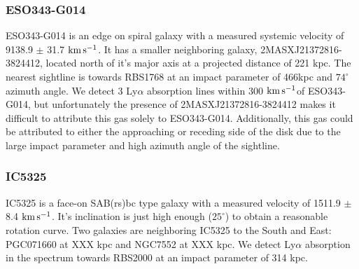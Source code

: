 \documentclass[iop]{emulateapj-rtx4}
\newcommand{\kms}{$\rm km\, s^{-1}$}
\begin{document}
%
%


\subsubsection{ESO343-G014}
ESO343-G014 is an edge on spiral galaxy with a measured systemic velocity of 9138.9 $\pm$ 31.7 \kms. It has a smaller neighboring galaxy, 2MASXJ21372816-3824412, located north of it's major axis at a projected distance of 221 kpc. The nearest sightline is towards RBS1768 at an impact parameter of 466kpc and $74^{\circ}$ azimuth angle. We detect 3 Ly$\alpha$ absorption lines within 300 \kms of ESO343-G014, but unfortunately the presence of 2MASXJ21372816-3824412 makes it difficult to attribute this gas solely to ESO343-G014. Additionally, this gas could be attributed to either the approaching or receding side of the disk due to the large impact parameter and high azimuth angle of the sightline. 

%


\subsubsection{IC5325}
IC5325 is a face-on SAB(rs)bc type galaxy with a measured velocity of 1511.9 $\pm$ 8.4 \kms. It's inclination is just high enough ($25^{\circ}$) to obtain a reasonable rotation curve. Two galaxies are neighboring IC5325 to the South and East: PGC071660 at XXX kpc and NGC7552 at XXX kpc. We detect Ly$\alpha$ absorption in the spectrum towards RBS2000 at an impact parameter of 314 kpc.
\end{document}
